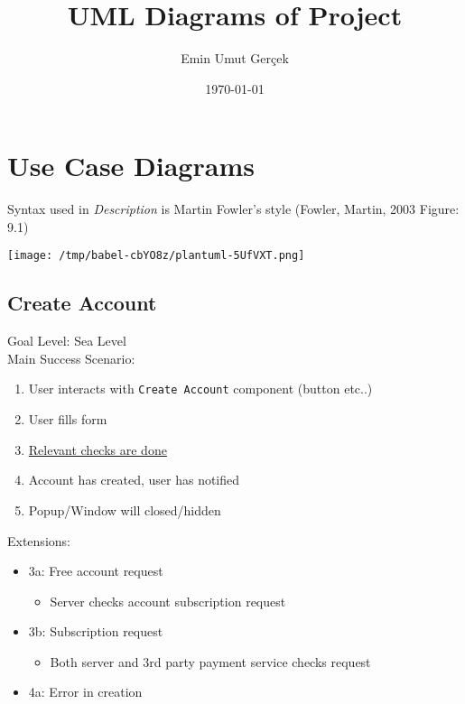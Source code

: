 \documentclass[11pt]{article}
\author{Emin Umut Gerçek}
\date{\today}
\title{UML Diagrams of Project}
\begin{document}
\maketitle
\tableofcontents

\setlength{\parindent}{0cm}


\pagebreak

\section{Use Case Diagrams}
\label{sec:org1b4af79}
Syntax used in \emph{Description} is Martin Fowler's style (Fowler, Martin, 2003 Figure: 9.1)

\begin{center}
\texttt{[image: /tmp/babel-cbYO8z/plantuml-5UfVXT.png]}
\end{center}

\subsection{Create Account}
\label{sec:org373b4ac}
Goal Level: Sea Level \\
Main Success Scenario: \\

\begin{enumerate}
\item User interacts with \texttt{Create Account} component (button etc..)
\item User fills form
\item \uline{Relevant checks are done}
\item Account has created, user has notified
\item Popup/Window will closed/hidden
\end{enumerate}

Extensions:
\begin{itemize}
\item 3a: Free account request
\begin{itemize}
\item Server checks account subscription request
\end{itemize}
\item 3b: Subscription request
\begin{itemize}
\item Both server and 3rd party payment service checks request
\end{itemize}
\item 4a: Error in creation
\end{itemize}
\end{document}
